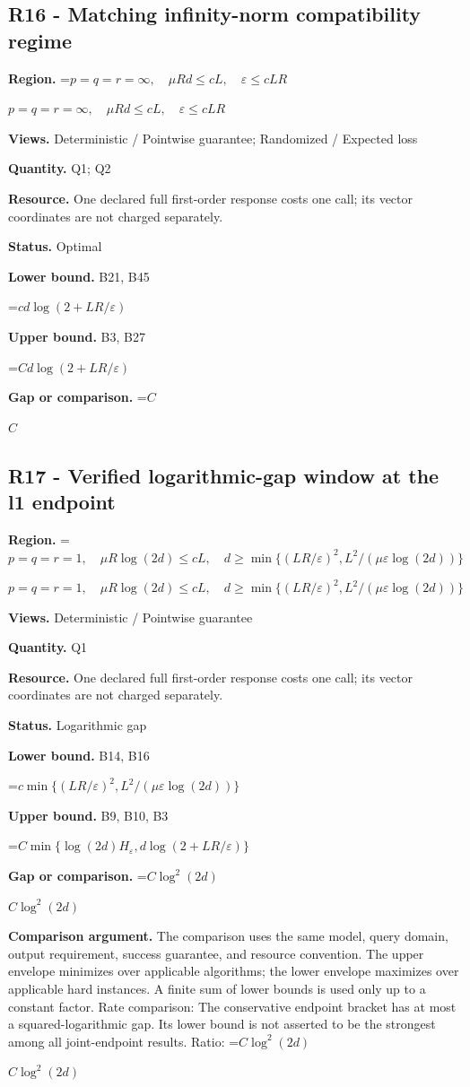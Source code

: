 \documentclass[10pt,a4paper]{article}
\newcommand{\AtlasMath}[1]{\par\begingroup\centering\setbox0=\hbox{$\displaystyle #1$}\ifdim\wd0>1.4\linewidth\typeout{ATLAS WIDE FORMULA: \the\wd0}\fi\ifdim\wd0>\linewidth\resizebox{\linewidth}{!}{\box0}\else\box0\fi\par\endgroup}
\newcommand{\AtlasInlineMath}[1]{\begingroup\setbox0=\hbox{$#1$}\ifdim\wd0>.4\linewidth\endgroup\AtlasMath{#1}\else\endgroup$#1$\fi}
\begin{document}
\subsection{R16 - Matching infinity-norm compatibility regime}
\textbf{Region.} \AtlasInlineMath{p=q=r=\infty,\quad\mu Rd\le cL,\quad\varepsilon\le cLR}

\textbf{Views.} Deterministic / Pointwise guarantee; Randomized / Expected loss

\textbf{Quantity.} Q1; Q2

\textbf{Resource.} One declared full first-order response costs one call; its vector coordinates are not charged separately.

\textbf{Status.} Optimal

\textbf{Lower bound.} B21, B45

\AtlasMath{cd\log(2+LR/\varepsilon)}
\textbf{Upper bound.} B3, B27

\AtlasMath{Cd\log(2+LR/\varepsilon)}
\textbf{Gap or comparison.} \AtlasInlineMath{C}

\subsection{R17 - Verified logarithmic-gap window at the l1 endpoint}
\textbf{Region.} \AtlasInlineMath{p=q=r=1,\quad\mu R\log(2d)\le cL,\quad d\ge\min\{(LR/\varepsilon)^2,L^2/(\mu\varepsilon\log(2d))\}}

\textbf{Views.} Deterministic / Pointwise guarantee

\textbf{Quantity.} Q1

\textbf{Resource.} One declared full first-order response costs one call; its vector coordinates are not charged separately.

\textbf{Status.} Logarithmic gap

\textbf{Lower bound.} B14, B16

\AtlasMath{c\min\{(LR/\varepsilon)^2,L^2/(\mu\varepsilon\log(2d))\}}
\textbf{Upper bound.} B9, B10, B3

\AtlasMath{C\min\{\log(2d)H_\varepsilon,d\log(2+LR/\varepsilon)\}}
\textbf{Gap or comparison.} \AtlasInlineMath{C\log^2(2d)}

\textbf{Comparison argument.} The comparison uses the same model, query domain, output requirement, success guarantee, and resource convention. The upper envelope minimizes over applicable algorithms; the lower envelope maximizes over applicable hard instances. A finite sum of lower bounds is used only up to a constant factor. Rate comparison: The conservative endpoint bracket has at most a squared-logarithmic gap. Its lower bound is not asserted to be the strongest among all joint-endpoint results. Ratio: \AtlasInlineMath{C\log^2(2d)}
\end{document}
